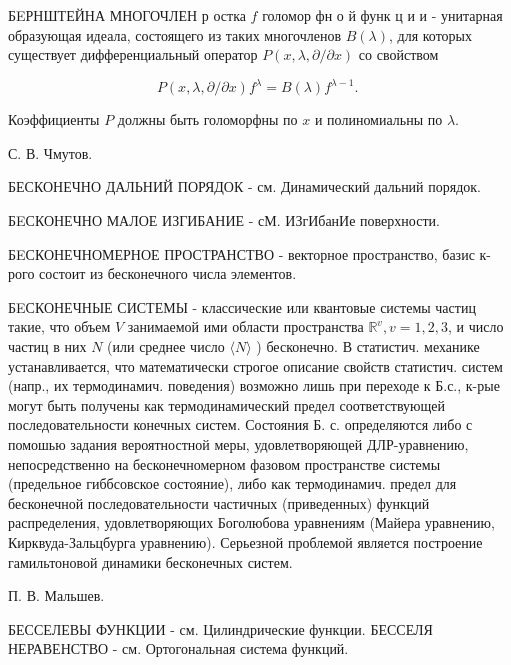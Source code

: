 \documentclass[10pt]{article}
\begin{document}
БEРНШТЕЙНА МНОГОЧЛЕН р остка $f$ голомор фн о й функ ц и и - унитарная образующая идеала, состоящего из таких многочленов $B(\lambda)$, для которых существует дифференциальный оператор $P(x, \lambda, \partial / \partial x)$ со свойством



\[

P(x, \lambda, \partial / \partial x) f^{\lambda}=B(\lambda) f^{\lambda-1} \text {. }

\]



Коэффициенты $P$ должны быть голоморфны по $x$ и полиномиальны по $\lambda$.



С. В. Чмутов.



БЕСКОНЕЧНО ДАЛЬНИЙ ПОРЯДОК - см. Динамический дальний порядок.



БEСКОНЕЧНО МАЛОЕ ИЗГИБАНИЕ - сМ. ИЗгИбанИе поверхности.



БEСКОНЕЧНОМЕРНОЕ ПРОСТРАНСТВО - векторное пространство, базис к-рого состоит из бесконечного числа элементов.



БEСКОНЕЧНЫЕ СИСТЕМЫ - классические или квантовые системы частиц такие, что объем $V$ занимаемой ими области пространства $\mathbb{R}^{v}, v=1,2,3$, и число частиц в них $N$ (или среднее число $\langle N\rangle$ ) бесконечно. В статистич. механике устанавливается, что математически строгое описание свойств статистич. систем (напр., их термодинамич. поведения) возможно лишь при переходе к Б.с., к-рые могут быть получены как термодинамический предел соответствующей последовательности конечных систем. Состояния Б. с. определяются либо с помошью задания вероятностной меры, удовлетворяющей ДЛР-уравнению, непосредственно на бесконечномерном фазовом пространстве системы (предельное гиббсовское состояние), либо как термодинамич. предел для бесконечной последовательности частичных (приведенных) функций распределения, удовлетворяющих Боголюбова уравнениям (Майера уравнению, Кирквуда-Зальцбурга уравнению). Серьезной проблемой является построение гамильтоновой динамики бесконечных систем.



П. В. Мальшев.



БЕССЕЛЕВЫ ФУНКЦИИ - см. Цилиндрические функции. БЕССЕЛЯ НЕРАВЕНСТВО - см. Ортогональная система функций.
\end{document}
